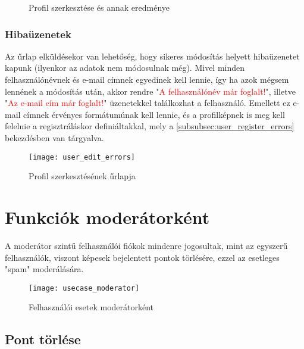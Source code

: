 \begin{figure}[H]
	\centering
	\hspace{5pt}
	\caption{Profil szerkesztése és annak eredménye}
	\label{fig:user_edit}
\end{figure}

\subsubsection{Hibaüzenetek}

Az űrlap elküldésekor van lehetőség, hogy sikeres módosítás helyett hibaüzenetet kapunk (ilyenkor az adatok nem módosulnak  még). Mivel minden felhasználónévnek és e-mail címnek egyedinek kell lennie, így ha azok mégsem lennének a módosítás után, 
akkor rendre "\textcolor{red}{A felhasználónév már foglalt!}", illetve "\textcolor{red}{Az e-mail cím már foglalt!}" üzenetekkel találkozhat a felhasználó. Emellett ez e-mail címnek érvényes formátumúnak kell lennie, és a profilképnek is meg kell felelnie a regisztráláskor definiáltakkal, mely a \ref{subsubsec:user_register_errors} bekezdésben van tárgyalva.

\begin{figure}[H]
	\centering
	\texttt{[image: user\_edit\_errors]}
	\caption{Profil szerkesztésének űrlapja}
	\label{fig:user_edit_errors}
\end{figure}

\section{Funkciók moderátorként}

A moderátor szintű felhasználói fiókok mindenre jogosultak, mint az egyszerű felhasználók, viszont képesek bejelentett pontok törlésére, ezzel az esetleges "spam" moderálására.

\begin{figure}[H]
	\centering
	\texttt{[image: usecase\_moderator]}
	\caption{Felhasználói esetek moderátorként}
	\label{fig:usecase_moderator}
\end{figure}

\subsection{Pont törlése}
\label{subsec:trash_delete}

